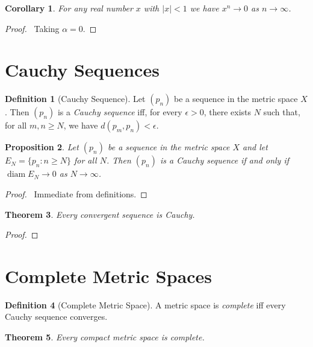 \documentclass{book}
\let\qed\relax
\newtheorem{prop}{Proposition}[chapter]
\newtheorem{cor}{Corollary}[prop]
\newtheorem{thm}[prop]{Theorem}
\theoremstyle{definition}
\newtheorem{df}[prop]{Definition}
\newcommand{\diam}{\ensuremath{\operatorname{diam}}}
\begin{document}
\begin{cor}
For any real number $x$ with $|x| < 1$ we have $x^n \rightarrow 0$ as $n \rightarrow \infty$.
\end{cor}

\begin{proof}
\pf\ Taking $\alpha = 0$. \qed
\end{proof}

\section{Cauchy Sequences}

\begin{df}[Cauchy Sequence]
Let $(p_n)$ be a sequence in the metric space $X$. Then $(p_n)$ is a \emph{Cauchy sequence} iff, for every $\epsilon > 0$, there exists $N$ such that, for all $m,n \geq N$, we have $d(p_m,p_n) < \epsilon$.
\end{df}

\begin{prop}
Let $(p_n)$ be a sequence in the metric space $X$ and let $E_N = \{ p_n : n \geq N \}$ for all $N$. Then $(p_n)$ is a Cauchy sequence if and only if $\diam E_N \rightarrow 0$ as $N \rightarrow \infty$.
\end{prop}

\begin{proof}
\pf\ Immediate from definitions. \qed
\end{proof}

\begin{thm}
Every convergent sequence is Cauchy.
\end{thm}

\begin{proof}
\pf
{}
\qed
\end{proof}

\section{Complete Metric Spaces}

\begin{df}[Complete Metric Space]
A metric space is \emph{complete} iff every Cauchy sequence converges.
\end{df}

\begin{thm}
Every compact metric space is complete.
\end{thm}
\end{document}

